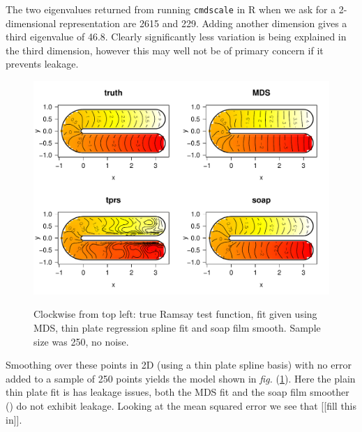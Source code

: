 \documentclass[a4paper,10pt]{article}
\newcommand{\fig}[1]{\emph{fig.} (\ref{#1})}
\begin{document}

The two eigenvalues returned from running \texttt{cmdscale} in \textsf{R} when we ask for a 2-dimensional representation are 2615 and 229. Adding another dimension gives a third eigenvalue of 46.8. Clearly significantly less variation is being explained in the third dimension, however this may well not be of primary concern if it prevents leakage.

\begin{figure}
\centering
\includegraphics[width=5.5in]{figs/ramsay-mds-smooth-noerr.pdf} \\
\caption{Clockwise from top left: true Ramsay test function, fit given using MDS, thin plate regression spline fit and soap film smooth. Sample size was 250, no noise.}
\label{ramsay-mds-smooth-noerr}
\end{figure}

Smoothing over these points  in 2D (using a thin plate spline basis) with no error added to a sample of 250 points yields the model shown in \fig{ramsay-mds-smooth-noerr}. Here the plain thin plate fit is has leakage issues, both the MDS fit and the soap film smoother (\cite{soap}) do not exhibit leakage. Looking at the mean squared error we see that [[fill this in]].

\end{document}
